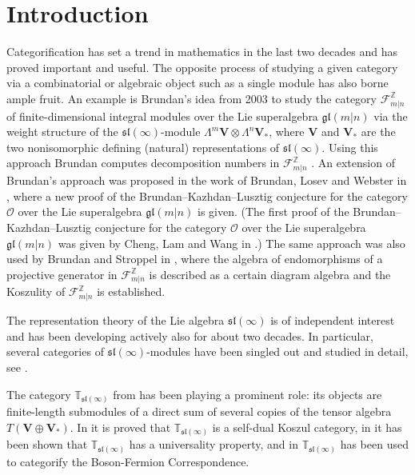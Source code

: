 \documentclass[12pt,oneside,english]{amsart}
\numberwithin{equation}{section}
\numberwithin{figure}{section}
\theoremstyle{plain}
\theoremstyle{plain}
\theoremstyle{remark}
\theoremstyle{definition}
\theoremstyle{plain}
\theoremstyle{remark}
\theoremstyle{definition}
\theoremstyle{plain}
\theoremstyle{plain}
\theoremstyle{definition}
\newcommand{\bV}{\mathbf{V}}
\begin{document}
\maketitle



\section{Introduction}


Categorification has set a trend in mathematics in the last two decades and has proved important and useful. The opposite process of studying a given category via a combinatorial  or algebraic object such as a single module has also borne ample fruit. An example is Brundan's idea from 2003 to study the category $\mathcal F_{m|n}^{\mathbb Z}$ of finite-dimensional integral modules over the Lie superalgebra $\mathfrak{gl}(m|n)$ via the weight structure of the $\mathfrak{sl}(\infty)$-module $\Lambda^{m}\bV\otimes\Lambda^{n}\bV_*$, where $\bV$ and $\bV_*$ are the two nonisomorphic defining (natural) representations of $\mathfrak{sl}(\infty)$. Using this approach  Brundan computes decomposition numbers in $\mathcal F_{m|n}^{\mathbb Z}$ \cite{B}.   An extension of Brundan's approach was proposed in the work
of Brundan, Losev and Webster in  \cite{BLW}, where a new proof of the Brundan--Kazhdan--Lusztig conjecture for the category $\mathcal O$ over the Lie
superalgebra $\mathfrak{gl}(m|n)$ is given. (The first proof of the Brundan--Kazhdan--Lusztig conjecture for the category $\mathcal O$ over the Lie
superalgebra $\mathfrak{gl}(m|n)$  was given by Cheng, Lam and Wang in \cite{CLW}.) The same approach was also used by  Brundan and Stroppel in \cite{BS4}, where the algebra of endomorphisms of a
projective generator in $\mathcal F_{m|n}^{\mathbb Z}$ is described as a certain diagram algebra and the Koszulity of $\mathcal F_{m|n}^{\mathbb Z}$ is established.

The representation theory of the Lie algebra $\mathfrak{sl}(\infty)$ is of independent interest and has been developing actively also for about two decades. In particular, several categories of $\mathfrak{sl}(\infty)$-modules have been singled out and studied in detail, see \cite{DP, PStyr, DPS, PS, Nam}.

The category $\mathbb T_{\mathfrak{sl}(\infty)}$ from \cite{DPS} has been playing a prominent role: its objects are finite-length submodules of a direct sum of several copies of the tensor algebra $T(\bV\oplus\bV_*)$. In \cite{DPS} it is proved that $\mathbb T_{\mathfrak{sl}(\infty)}$ is a self-dual Koszul category, in \cite{SS} it has been shown that  $\mathbb T_{\mathfrak{sl}(\infty)}$ has a universality property, and in \cite{FPS} $\mathbb T_{\mathfrak{sl}(\infty)}$ has been used to categorify the Boson-Fermion Correspondence.
\end{document}
